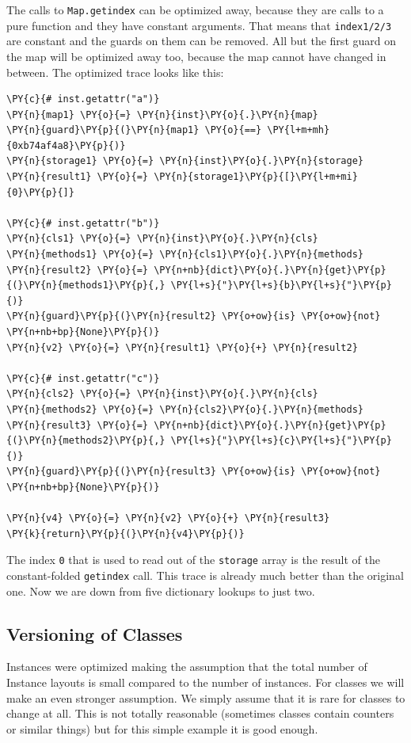 \documentclass{sig-alternate}
\begin{document}
The calls to \texttt{Map.getindex} can be optimized away, because they are calls to
a pure function and they have constant arguments. That means that \texttt{index1/2/3}
are constant and the guards on them can be removed. All but the first guard on
the map will be optimized away too, because the map cannot have changed in
between. The optimized trace looks like this:
\begin{Verbatim}[commandchars=\\\{\}]
\PY{c}{# inst.getattr("a")}
\PY{n}{map1} \PY{o}{=} \PY{n}{inst}\PY{o}{.}\PY{n}{map}
\PY{n}{guard}\PY{p}{(}\PY{n}{map1} \PY{o}{==} \PY{l+m+mh}{0xb74af4a8}\PY{p}{)}
\PY{n}{storage1} \PY{o}{=} \PY{n}{inst}\PY{o}{.}\PY{n}{storage}
\PY{n}{result1} \PY{o}{=} \PY{n}{storage1}\PY{p}{[}\PY{l+m+mi}{0}\PY{p}{]}

\PY{c}{# inst.getattr("b")}
\PY{n}{cls1} \PY{o}{=} \PY{n}{inst}\PY{o}{.}\PY{n}{cls}
\PY{n}{methods1} \PY{o}{=} \PY{n}{cls1}\PY{o}{.}\PY{n}{methods}
\PY{n}{result2} \PY{o}{=} \PY{n+nb}{dict}\PY{o}{.}\PY{n}{get}\PY{p}{(}\PY{n}{methods1}\PY{p}{,} \PY{l+s}{"}\PY{l+s}{b}\PY{l+s}{"}\PY{p}{)}
\PY{n}{guard}\PY{p}{(}\PY{n}{result2} \PY{o+ow}{is} \PY{o+ow}{not} \PY{n+nb+bp}{None}\PY{p}{)}
\PY{n}{v2} \PY{o}{=} \PY{n}{result1} \PY{o}{+} \PY{n}{result2}

\PY{c}{# inst.getattr("c")}
\PY{n}{cls2} \PY{o}{=} \PY{n}{inst}\PY{o}{.}\PY{n}{cls}
\PY{n}{methods2} \PY{o}{=} \PY{n}{cls2}\PY{o}{.}\PY{n}{methods}
\PY{n}{result3} \PY{o}{=} \PY{n+nb}{dict}\PY{o}{.}\PY{n}{get}\PY{p}{(}\PY{n}{methods2}\PY{p}{,} \PY{l+s}{"}\PY{l+s}{c}\PY{l+s}{"}\PY{p}{)}
\PY{n}{guard}\PY{p}{(}\PY{n}{result3} \PY{o+ow}{is} \PY{o+ow}{not} \PY{n+nb+bp}{None}\PY{p}{)}

\PY{n}{v4} \PY{o}{=} \PY{n}{v2} \PY{o}{+} \PY{n}{result3}
\PY{k}{return}\PY{p}{(}\PY{n}{v4}\PY{p}{)}
\end{Verbatim}

The index \texttt{0} that is used to read out of the \texttt{storage} array is the result
of the constant-folded \texttt{getindex} call. This trace is already much better than
the original one. Now we are down from five dictionary lookups to just two.



\subsection{Versioning of Classes}

Instances were optimized making the assumption that the total number of
Instance layouts is small compared to the number of instances. For classes we
will make an even stronger assumption. We simply assume that it is rare for
classes to change at all. This is not totally reasonable (sometimes classes contain
counters or similar things) but for this simple example it is good enough.
\end{document}

